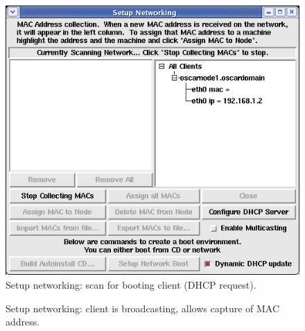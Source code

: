 \begin{figure}[!ht]
  \begin{center}
    \centerline{
      \includegraphics[scale=\imgscale]{figs/6ca_sbs-client-boot1}}
    \caption{Setup networking: scan for booting client (DHCP request).}
    \label{fig:sbs-client-boot2}
  \end{center}
\end{figure}

\begin{figure}[!ht]
  \begin{center}
    \centerline{
      }
    \caption{Setup networking: client is broadcasting, allows capture
      of MAC address.}
    \label{fig:sbs-collect-broadcast} 
  \end{center}
\end{figure}

